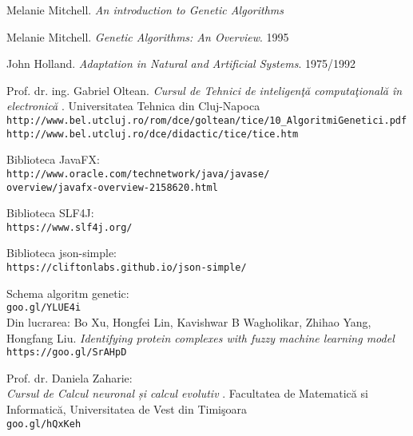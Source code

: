\begin{thebibliography}{99}

Melanie Mitchell.
\textit{An introduction to Genetic Algorithms}

Melanie Mitchell. 
\textit{Genetic Algorithms: An Overview}. 1995

John Holland. 
\textit{Adaptation in Natural and Artificial Systems}. 1975/1992

Prof. dr. ing. Gabriel Oltean.
\textit{Cursul de Tehnici de inteligenţă computaţională în electronică}
. Universitatea Tehnica din Cluj-Napoca
\\\texttt{http://www.bel.utcluj.ro/rom/dce/goltean/tice/10\_AlgoritmiGenetici.pdf}
\\\texttt{http://www.bel.utcluj.ro/dce/didactic/tice/tice.htm}

Biblioteca JavaFX:\\
\texttt{http://www.oracle.com/technetwork/java/javase/}\\
\texttt{overview/javafx-overview-2158620.html}

Biblioteca SLF4J:\\
\texttt{https://www.slf4j.org/}

Biblioteca json-simple:\\
\texttt{https://cliftonlabs.github.io/json-simple/}

Schema algoritm genetic:
\\\texttt{goo.gl/YLUE4i}\\
Din lucrarea: Bo Xu, Hongfei Lin, Kavishwar B Wagholikar, Zhihao Yang, Hongfang Liu. \textit{Identifying protein complexes with fuzzy machine learning model}
\\\texttt{https://goo.gl/SrAHpD} 

Prof. dr. Daniela Zaharie:\\
\textit{Cursul de Calcul neuronal și calcul evolutiv}
. Facultatea de Matematică si Informatică, Universitatea de Vest din Timişoara
\\\texttt{goo.gl/hQxKeh}

\end{thebibliography}
